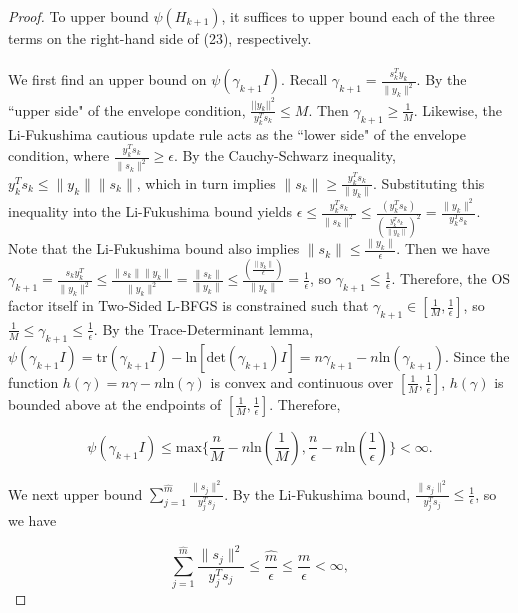 \documentclass[twoside,11pt]{article}
\begin{document}
\begin{proof}
\noindent
To upper bound $\psi(H_{k+1})$, it suffices to upper bound each of the three terms on the right-hand side of (23), respectively. \\
\\
We first find an upper bound on $\psi(\gamma_{k+1}I)$. Recall $\gamma_{k+1} = \frac{s_k^Ty_k}{\|y_k\|^2}$. By the ``upper side" of the envelope condition, $\frac{||y_k||^2}{y_k^Ts_k} \leq M$. Then $\gamma_{k+1} \geq \frac{1}{M}$. Likewise, the Li-Fukushima cautious update rule acts as the ``lower side" of the envelope condition, where $\frac{y_k^T s_k}{\|s_k\|^2} \geq \epsilon$. By the Cauchy-Schwarz inequality, $y_k^T s_k \leq \|y_k\| \|s_k\|$, which in turn implies $\|s_k\| \geq \frac{y_k^T s_k}{\|y_k\|}$. Substituting this inequality into the Li-Fukushima bound yields $\epsilon \leq \frac{y_k^T s_k}{\|s_k\|^2} \leq \frac{(y_k^T s_k)}{(\frac{y_k^T s_k}{\|y_k\|})^2} = \frac{\|y_k\|^2}{y_k^T s_k}$. Note that the Li-Fukushima bound also implies $\|s_k\| \leq \frac{\|y_k\|}{\epsilon}$. Then we have $\gamma_{k+1} = \frac{s_k y_k^T}{\|y_k\|^2} \leq \frac{\|s_k\| \|y_k\|}{\|y_k\|^2} = \frac{\|s_k\|}{\|y_k\|} \leq \frac{(\frac{\|y_k\|}{\epsilon})}{\|y_k\|} = \frac{1}{\epsilon}$, so $\gamma_{k+1} \leq \frac{1}{\epsilon}$. Therefore, the OS factor itself in Two-Sided L-BFGS is constrained such that $\gamma_{k+1} \in [\frac{1}{M}, \frac{1}{\epsilon}]$, so $\frac{1}{M} \leq \gamma_{k+1} \leq \frac{1}{\epsilon}$. By the Trace-Determinant lemma, $\psi(\gamma_{k+1}I) = \text{tr}(\gamma_{k+1}I) - \text{ln}[\text{det}(\gamma_{k+1})I] = n\gamma_{k+1} - n\text{ln}(\gamma_{k+1})$. Since the function $h(\gamma) = n\gamma - n\text{ln}(\gamma)$ is convex and continuous over $[\frac{1}{M}, \frac{1}{\epsilon}]$, $h(\gamma)$ is bounded above at the endpoints of $[\frac{1}{M}, \frac{1}{\epsilon}]$. Therefore,

\begin{equation}
\psi(\gamma_{k+1}I) \leq \text{max}\{\frac{n}{M}-n\text{ln}(\frac{1}{M}), \frac{n}{\epsilon}-n\text{ln}(\frac{1}{\epsilon})\} < \infty.
\end{equation}

\noindent
We next upper bound $\sum_{j=1}^{\hat{m}} \frac{\|s_j\|^2}{y_j^T s_j}$. By the Li-Fukushima bound, $\frac{\|s_j\|^2}{y_j^T s_j} \leq \frac{1}{\epsilon}$, so we have

\begin{equation}
\sum_{j=1}^{\hat{m}} \frac{\|s_j\|^2}{y_j^T s_j} \leq \frac{\hat{m}}{\epsilon} \leq \frac{m}{\epsilon} < \infty,
\end{equation}


\end{proof}
\end{document}
